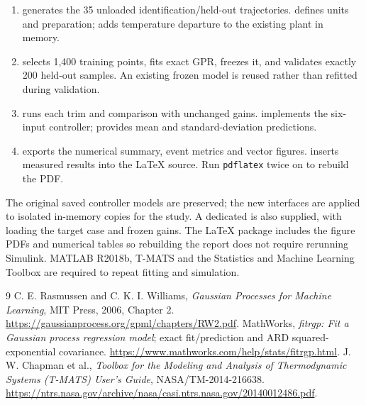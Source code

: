 \documentclass[11pt,a4paper]{article}
\begin{document}
\begin{enumerate}
\item {} generates the 35 unloaded identification/held-out trajectories.  defines units and preparation;  adds temperature departure to the existing plant in memory.
\item {} selects 1,400 training points, fits exact GPR, freezes it, and validates exactly 200 held-out samples. An existing frozen model is reused rather than refitted during validation.
\item {} runs each trim and comparison with unchanged gains.  implements the six-input controller;  provides mean and standard-deviation predictions.
\item {} exports the numerical summary, event metrics and vector figures.  inserts measured results into the LaTeX source. Run \texttt{pdflatex} twice on  to rebuild the PDF.
\end{enumerate}
The original saved controller models are preserved; the new interfaces are applied to isolated in-memory copies for the study. A dedicated  is also supplied, with  loading the target case and frozen gains. The LaTeX package includes the figure PDFs and numerical tables so rebuilding the report does not require rerunning Simulink. MATLAB R2018b, T-MATS and the Statistics and Machine Learning Toolbox are required to repeat fitting and simulation.

\begin{thebibliography}{9}
 C. E. Rasmussen and C. K. I. Williams, \emph{Gaussian Processes for Machine Learning}, MIT Press, 2006, Chapter 2. \url{https://gaussianprocess.org/gpml/chapters/RW2.pdf}.
 MathWorks, \emph{fitrgp: Fit a Gaussian process regression model}; exact fit/prediction and ARD squared-exponential covariance. \url{https://www.mathworks.com/help/stats/fitrgp.html}.
 J. W. Chapman et al., \emph{Toolbox for the Modeling and Analysis of Thermodynamic Systems (T-MATS) User's Guide}, NASA/TM-2014-216638. \url{https://ntrs.nasa.gov/archive/nasa/casi.ntrs.nasa.gov/20140012486.pdf}.
\end{thebibliography}
\end{document}
